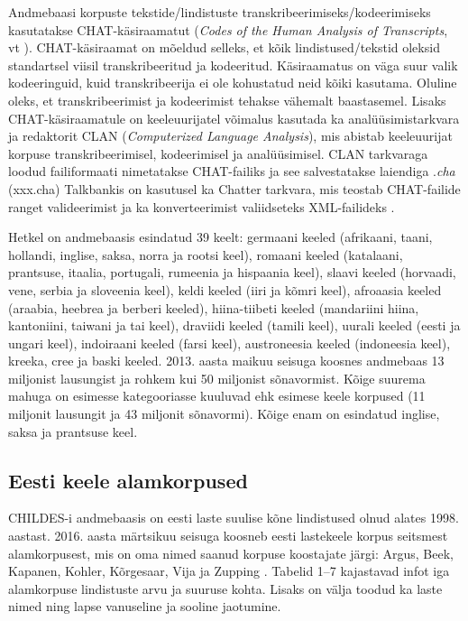 \documentclass[12pt]{article}
\begin{document}
Andmebaasi korpuste tekstide/lindistuste transkribeerimiseks/kodeerimiseks kasutatakse CHAT-käsiraamatut (\emph{Codes of the Human Analysis of Transcripts}, vt \citep{CHAT}). CHAT-käsiraamat on mõeldud selleks, et kõik lindistused/tekstid oleksid standartsel viisil transkribeeritud ja kodeeritud. Käsiraamatus on väga suur valik kodeeringuid, kuid transkribeerija ei ole kohustatud neid kõiki kasutama. Oluline oleks, et transkribeerimist ja kodeerimist tehakse vähemalt baastasemel. Lisaks CHAT-käsiraamatule on keeleuurijatel võimalus kasutada ka analüüsimistarkvara ja redaktorit CLAN (\emph{Computerized Language Analysis}), mis abistab keeleuurijat korpuse transkribeerimisel, kodeerimisel ja analüüsimisel. CLAN tarkvaraga loodud failiformaati nimetatakse CHAT-failiks ja see salvestatakse laiendiga .\emph{cha} (xxx.cha) \citep[1--2, 6]{Gillis} Talkbankis on kasutusel ka Chatter tarkvara, mis teostab CHAT-failide ranget valideerimist ja ka konverteerimist valiidseteks XML-failideks \citep{CHATTER}.

Hetkel on andmebaasis esindatud 39 keelt: germaani keeled (afrikaani, taani, hollandi, inglise, saksa, norra ja rootsi keel), romaani keeled (katalaani, prantsuse, itaalia, portugali, rumeenia ja hispaania keel), slaavi keeled (horvaadi, vene, serbia ja sloveenia keel), keldi keeled (iiri ja kõmri keel), afroaasia keeled (araabia, heebrea ja berberi keeled), hiina-tiibeti keeled (mandariini hiina, kantoniini, taiwani ja tai keel), draviidi keeled (tamili keel), uurali keeled (eesti ja ungari keel), indoiraani keeled (farsi keel), austroneesia keeled (indoneesia keel), kreeka, cree ja baski keeled. 2013. aasta maikuu seisuga koosnes andmebaas 13 miljonist lausungist ja rohkem kui 50 miljonist sõnavormist. Kõige suurema mahuga on esimesse kategooriasse kuuluvad ehk esimese keele korpused (11 miljonit lausungit ja 43 miljonit sõnavormi). Kõige enam on esindatud inglise, saksa ja prantsuse keel.\citep[2--5]{Gillis}

\subsection{Eesti keele alamkorpused}

CHILDES-i andmebaasis on eesti laste suulise kõne lindistused olnud alates 1998. aastast. 2016. aasta märtsikuu seisuga koosneb eesti lastekeele korpus seitsmest alamkorpusest, mis on oma nimed saanud korpuse koostajate järgi: Argus, Beek, Kapanen, Kohler, Kõrgesaar, Vija ja Zupping \citep{CHILDES}. Tabelid 1--7 kajastavad infot iga alamkorpuse lindistuste arvu ja suuruse kohta. Lisaks on välja toodud ka laste nimed ning lapse vanuseline ja sooline jaotumine.\\
\hfill
\end{document}
